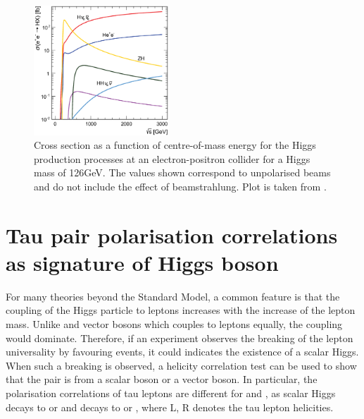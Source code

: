 \begin{figure}[!htbp]
\centering
\includegraphics[width=0.45\textwidth]{theory/HiggsCLICcrossSection}
\caption[]
{Cross section as a function of centre-of-mass energy for the Higgs production processes at an electron-positron collider for a Higgs mass of 126GeV. The values shown correspond
to unpolarised beams and do not include the effect of beamstrahlung. Plot is taken from \cite{Abramowicz:2016zbo}.}
\label{fig:theoryHiggsCrossSection}
\end{figure}


\section{Tau pair polarisation correlations as signature of Higgs boson}
\label{sec:theoryTauPair}
For many theories beyond the Standard Model, a common feature is that the coupling of the Higgs particle to leptons increases with the increase of the lepton mass. Unlike \PZ and \Pgamma vector bosons which couples to leptons equally, the \HigssTauTau coupling would dominate. Therefore, if an experiment observes the breaking of the lepton universality by favouring \TauTau events, it could indicates the existence of a scalar Higgs. When such a breaking is observed, a helicity correlation test can be used to show that the \TauTau pair is from a scalar boson or a vector boson. In particular, the polarisation correlations of tau leptons are different for \HiggsToTauTau and \ZToTauTau, as scalar Higgs decays to  or  and \PZ decays to  or , where L, R denotes the tau lepton helicities.


